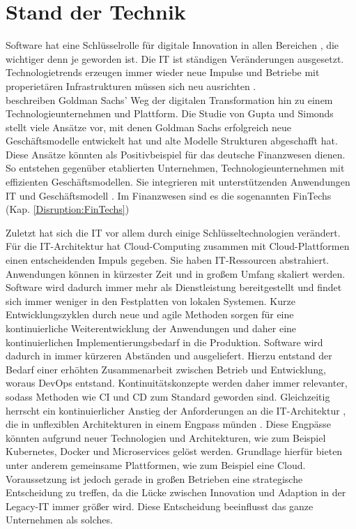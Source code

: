 \section{Stand der Technik}
Software hat eine Schlüsselrolle für digitale Innovation in allen Bereichen \cite{Alt2017}, die wichtiger denn je geworden ist. Die IT ist ständigen Veränderungen ausgesetzt. Technologietrends erzeugen immer wieder neue Impulse und Betriebe mit properietären Infrastrukturen müssen sich neu ausrichten \cite{Bussmann2006}.
\medskip
\\
\citet{Gupta:2017} beschreiben Goldman Sachs' Weg der digitalen Transformation hin zu einem Technologieunternehmen und Plattform. 
Die Studie von Gupta und Simonds stellt viele Ansätze vor, mit denen Goldman Sachs erfolgreich neue Geschäftsmodelle entwickelt hat und alte Modelle Strukturen abgeschafft hat. Diese Ansätze könnten als Positivbeispiel für das deutsche Finanzwesen dienen.
\medskip
\\
So entstehen gegenüber etablierten Unternehmen, Technologieunternehmen mit effizienten Geschäftsmodellen. Sie integrieren mit unterstützenden Anwendungen IT und Geschäftsmodell \cite{Bussmann2006}. Im Finanzwesen sind es die sogenannten FinTechs (Kap. \ref{Disruption:FinTechs})

Zuletzt hat sich die IT vor allem durch einige Schlüsseltechnologien verändert. Für die IT-Architektur hat Cloud-Computing zusammen mit Cloud-Plattformen einen entscheidenden Impuls gegeben. Sie haben IT-Ressourcen abstrahiert. Anwendungen können in kürzester Zeit und in großem Umfang skaliert werden. Software wird dadurch immer mehr als Dienstleistung bereitgestellt und findet sich immer weniger in den Festplatten von lokalen Systemen. Kurze Entwicklungszyklen durch neue und agile Methoden sorgen für eine kontinuierliche Weiterentwicklung der Anwendungen und daher eine kontinuierlichen Implementierungsbedarf in die Produktion. Software wird dadurch in immer kürzeren Abständen und ausgeliefert. Hierzu entstand der Bedarf einer erhöhten Zusammenarbeit zwischen Betrieb und Entwicklung, woraus DevOps entstand. Kontinuitätskonzepte werden daher immer relevanter, sodass Methoden wie \ac{CI} und \ac{CD} zum Standard geworden sind. Gleichzeitig herrscht ein kontinuierlicher Anstieg der Anforderungen an die IT-Architektur \cite{Bussmann2006}, die in unflexiblen Architekturen in einem Engpass münden \cite{Brockhoff2006, Bussmann2006}. Diese Engpässe könnten aufgrund neuer Technologien und Architekturen, wie zum Beispiel Kubernetes, Docker und Microservices gelöst werden. Grundlage hierfür bieten unter anderem gemeinsame Plattformen, wie zum Beispiel eine Cloud. Voraussetzung ist jedoch gerade in großen Betrieben eine strategische Entscheidung zu treffen, da die Lücke zwischen Innovation und Adaption in der Legacy-IT immer größer wird. Diese Entscheidung beeinflusst das ganze Unternehmen als solches.

